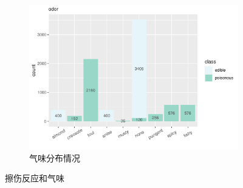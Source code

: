 \documentclass[lang=cn,11pt,a4paper,cite=super]{elegantpaper}
\begin{document}
\begin{enumerate}
\begin{figure}[htb]
\begin{subfigure}[t]{0.50\textwidth}
        \centering
        \includegraphics[width=\linewidth]{img/odor-1.pdf} 
        \caption{气味分布情况}
        \label{fig:odor} 
      \end{subfigure}
      \caption{擦伤反应和气味}
   \end{figure}


\end{enumerate}
\end{document}
